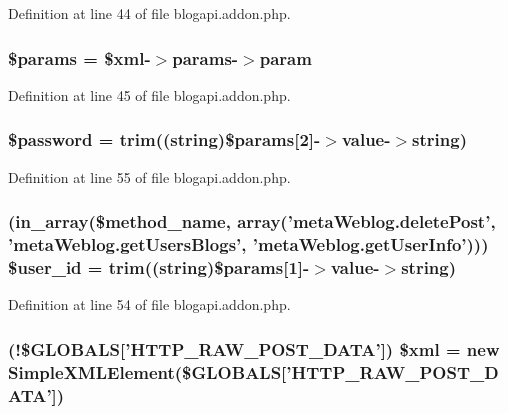 Definition at line 44 of file blogapi.\+addon.\+php.

\hypertarget{blogapi_8addon_8php_afe68e6fbe7acfbffc0af0c84a1996466}{
\subsubsection[{\$params}]{\setlength{\rightskip}{0pt plus 5cm}\$params = \$xml-\/$>$params-\/$>$param}}\label{blogapi_8addon_8php_afe68e6fbe7acfbffc0af0c84a1996466}


Definition at line 45 of file blogapi.\+addon.\+php.

\hypertarget{blogapi_8addon_8php_a607686ef9f99ea7c42f4f3dd3dbb2b0d}{
\subsubsection[{\$password}]{\setlength{\rightskip}{0pt plus 5cm}\$password = trim((string)\$params\mbox{[}2\mbox{]}-\/$>$value-\/$>$string)}}\label{blogapi_8addon_8php_a607686ef9f99ea7c42f4f3dd3dbb2b0d}


Definition at line 55 of file blogapi.\+addon.\+php.

\hypertarget{blogapi_8addon_8php_a6d0a036129b3030ce289a026c5e1eff2}{
\subsubsection[{\$user\+\_\+id}]{ (in\+\_\+array(\$method\+\_\+name, array('meta\+Weblog.\+delete\+Post', 'meta\+Weblog.\+get\+Users\+Blogs', 'meta\+Weblog.\+get\+User\+Info'))) \${\bf user\+\_\+id} = trim((string)\$params\mbox{[}1\mbox{]}-\/$>$value-\/$>$string)}}\label{blogapi_8addon_8php_a6d0a036129b3030ce289a026c5e1eff2}


Definition at line 54 of file blogapi.\+addon.\+php.

\hypertarget{blogapi_8addon_8php_a14ad998c59a6fcbcc09adbc67c7abb85}{
\subsubsection[{\$xml}]{ (!\$G\+L\+O\+B\+A\+L\+S\mbox{[}'H\+T\+T\+P\+\_\+\+R\+A\+W\+\_\+\+P\+O\+S\+T\+\_\+\+D\+A\+T\+A'\mbox{]}) \$xml = new Simple\+X\+M\+L\+Element(\$G\+L\+O\+B\+A\+L\+S\mbox{[}'H\+T\+T\+P\+\_\+\+R\+A\+W\+\_\+\+P\+O\+S\+T\+\_\+\+D\+A\+T\+A'\mbox{]})}}\label{blogapi_8addon_8php_a14ad998c59a6fcbcc09adbc67c7abb85}


